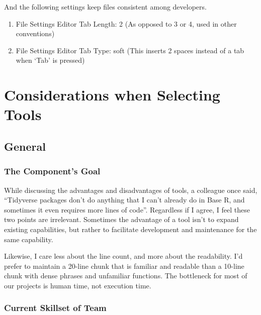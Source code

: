 \documentclass[
]{book}
\providecommand{\tightlist}{%
  \setlength{\itemsep}{0pt}\setlength{\parskip}{0pt}}
\begin{document}
\begin{itemize}
  And the following settings keep files consistent among developers.

  \begin{enumerate}
  \def\labelenumi{\arabic{enumi}.}
  \tightlist
  \item
    File \textbar{} Settings \textbar{} Editor \textbar{} Tab Length: 2 (As opposed to 3 or 4, used in other conventions)
  \item
    File \textbar{} Settings \textbar{} Editor \textbar{} Tab Type: soft (This inserts 2 spaces instead of a tab when `Tab' is pressed)
  \end{enumerate}
\end{itemize}

\hypertarget{tools}{%
\chapter{Considerations when Selecting Tools}\label{tools}}

\hypertarget{general}{%
\section{General}\label{general}}

\hypertarget{the-components-goal}{%
\subsection{The Component's Goal}\label{the-components-goal}}

While discussing the advantages and disadvantages of tools, a colleague once said, ``Tidyverse packages don't do anything that I can't already do in Base R, and sometimes it even requires more lines of code''. Regardless if I agree, I feel these two points are irrelevant. Sometimes the advantage of a tool isn't to expand existing capabilities, but rather to facilitate development and maintenance for the same capability.

Likewise, I care less about the line count, and more about the readability. I'd prefer to maintain a 20-line chunk that is familiar and readable than a 10-line chunk with dense phrases and unfamiliar functions. The bottleneck for most of our projects is human time, not execution time.

\hypertarget{current-skillset-of-team}{%
\subsection{Current Skillset of Team}\label{current-skillset-of-team}}
\end{document}
